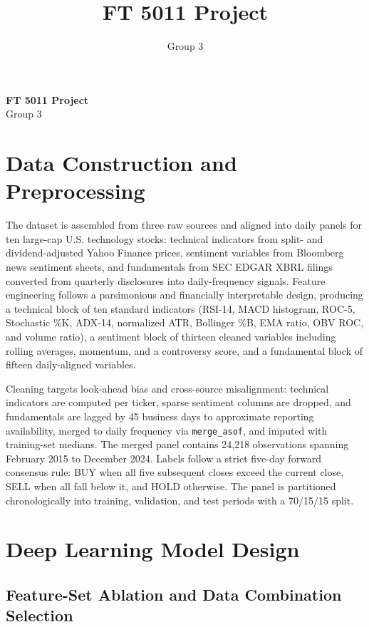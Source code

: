 \documentclass[12pt]{article}
\title{FT 5011 Project}
\author{Group 3}
\date{}
\begin{document}
\begin{center}
{\Large\bfseries FT 5011 Project}\\[0.3em]
{\normalsize Group 3}
\end{center}
\vspace{0.5em}

\section{Data Construction and Preprocessing}

The dataset is assembled from three raw sources and aligned into daily panels for ten large-cap U.S. technology stocks: technical indicators from split- and dividend-adjusted Yahoo Finance prices, sentiment variables from Bloomberg news sentiment sheets, and fundamentals from SEC EDGAR XBRL filings converted from quarterly disclosures into daily-frequency signals. Feature engineering follows a parsimonious and financially interpretable design, producing a technical block of ten standard indicators (RSI-14, MACD histogram, ROC-5, Stochastic \%K, ADX-14, normalized ATR, Bollinger \%B, EMA ratio, OBV ROC, and volume ratio), a sentiment block of thirteen cleaned variables including rolling averages, momentum, and a controversy score, and a fundamental block of fifteen daily-aligned variables.

Cleaning targets look-ahead bias and cross-source misalignment: technical indicators are computed per ticker, sparse sentiment columns are dropped, and fundamentals are lagged by 45 business days to approximate reporting availability, merged to daily frequency via \texttt{merge\_asof}, and imputed with training-set medians. The merged panel contains 24{,}218 observations spanning February 2015 to December 2024. Labels follow a strict five-day forward consensus rule: BUY when all five subsequent closes exceed the current close, SELL when all fall below it, and HOLD otherwise. The panel is partitioned chronologically into training, validation, and test periods with a 70/15/15 split.

\section{Deep Learning Model Design}

\subsection{Feature-Set Ablation and Data Combination Selection}
\end{document}
